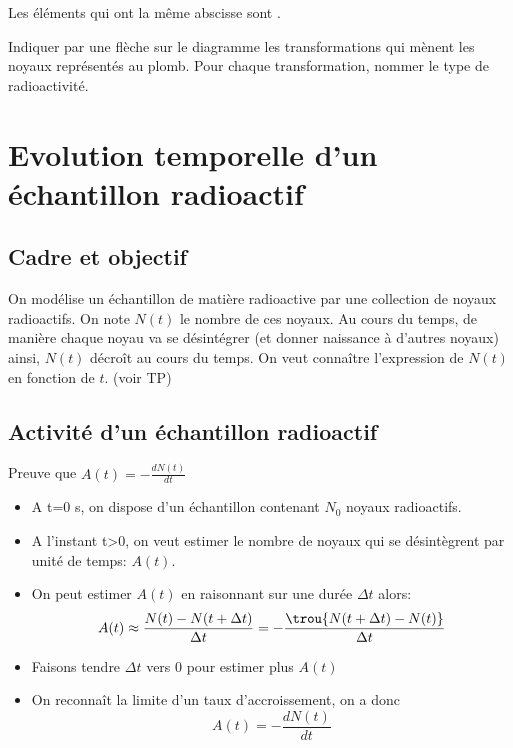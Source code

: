     Les éléments qui ont la même abscisse sont .
  
   Indiquer par une flèche sur le diagramme les transformations qui mènent les noyaux représentés au plomb.
    Pour chaque transformation, nommer le type de radioactivité.
    
    
\section{Evolution temporelle d'un échantillon radioactif}
\subsection{Cadre et objectif}
On modélise un échantillon de matière radioactive par une collection de noyaux radioactifs. On note $N(t)$ le nombre de ces noyaux. Au cours du temps, de manière  chaque noyau va se désintégrer (et donner naissance à d'autres noyaux) ainsi, $N(t)$ décroît au cours du temps. On veut connaître l'expression de  $N(t)$ en fonction de $t$. (voir TP)

\subsection{Activité d'un échantillon radioactif}


 Preuve que $A(t)=-\frac{dN(t)}{dt}$
\begin{itemize}
	\item A t=0 s, on dispose d'un échantillon contenant $N_0$ noyaux radioactifs.
	\item A l'instant t>0, on veut estimer le nombre de noyaux qui se désintègrent par unité de temps: $A(t)$.
	\item On peut estimer $A(t)$ en raisonnant sur une durée $\Delta t$ alors: $$A(t)\approx \frac{N(t)-N(t+\Delta t)}{\Delta t}=-\frac{\trou{N(t+\Delta t)-N(t)}}{\Delta t}$$
	\item  Faisons tendre $\Delta t$ vers 0 pour estimer plus  $A(t)$
	\item On reconnaît la limite d'un taux d'accroissement, on a donc $$A(t)=-\frac{dN(t)}{dt}$$
\end{itemize}

